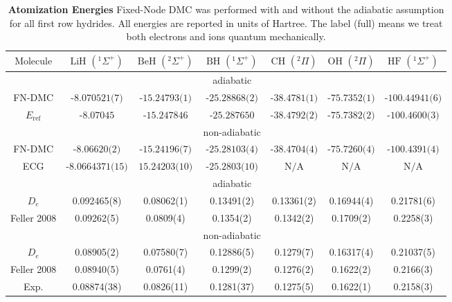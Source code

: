 \documentclass[aps,prl,superscriptaddress,groupedaddress]{revtex4}
\begin{document}
\begin{table}[htpb!]
\setlength{\extrarowheight}{3pt}
\begin{tabular}{*{1}{*{7}{c}}}
\hline\hline
$\text{Molecule}$ & $\text{LiH }(^1\Sigma^+)$ & $\text{BeH }(^2\Sigma^+)$ & $\text{BH }(^1\Sigma^+)$ & $\text{CH }(^2\Pi)$ & $\text{OH }(^2\Pi)$ & $\text{HF }(^1\Sigma^+)$ \\ \hline
&&&adiabatic&&& \\
FN-DMC & $\text{-8.070521(7)}$ & $\text{-15.24793(1)}$ & $\text{-25.28868(2)}$ & $\text{-38.4781(1)}$ & $\text{-75.7352(1)}$ & $\text{-100.44941(6)}$ \\
$E_{\text{ref}}$ \footnotemark[1] \cite{Adamowicz_LiH,Koput_BeH,Miliordos_BH,Davidson_Atoms,Feller_Corrections} & $\text{-8.07045}$ & $\text{-15.247846}$ & $\text{-25.287650}$ & $\text{-38.4792(2)}$ & $\text{-75.7382(2)}$ & $\text{-100.4600(3)}$ \\
&&&non-adiabatic&&& \\
FN-DMC & $\text{-8.06620(2)}$ & $\text{-15.24196(7)}$ & $\text{-25.28103(4)}$ & $\text{-38.4704(4)}$ & $\text{-75.7260(4)}$ & $\text{-100.4391(4)}$ \\
ECG \cite{Bubin_LiH_noBO,Bubin_BeH_noBO,Bubin_BH_noBO} & $\text{-8.0664371(15)}$ & $\text{15.24203(10)}$ & $\text{-25.2803(10)}$ & $\text{N/A}$ & $\text{N/A}$ & $\text{N/A}$ \\
\hline
&&&adiabatic&&& \\
$D_{e}$ & 0.092465(8) & 0.08062(1) & 0.13491(2) & 0.13361(2) & 0.16944(4) & 0.21781(6) \\
Feller 2008\footnotemark[2] \cite{Feller_Corrections} & 0.09262(5) & 0.0809(4) & 0.1354(2) & 0.1342(2) & 0.1709(2) & 0.2258(3) \\
&&&non-adiabatic&&& \\
$D_{e}$ & 0.08905(2)  & 0.07580(7)  & 0.12886(5) & 0.1279(7) & 0.16317(4) & 0.21037(5) \\
Feller 2008\footnotemark[3] \cite{Feller_Corrections} & 0.08940(5) & 0.0761(4) & 0.1299(2) & 0.1276(2) & 0.1622(2) & 0.2166(3)\\
Exp. \cite{CCCBDB} & 0.08874(38) & 0.0826(11) & 0.1281(37) & 0.1275(5) & 0.1622(1) & 0.2158(3) \\
\hline\hline
\end{tabular}
\caption{\textbf{Atomization Energies} Fixed-Node DMC was performed with and without the adiabatic assumption for all first row hydrides. All energies are reported in units of Hartree. The label (full) means we treat both electrons and ions quantum mechanically.\label{tab:atomization}}
\end{table} 
\end{document}
